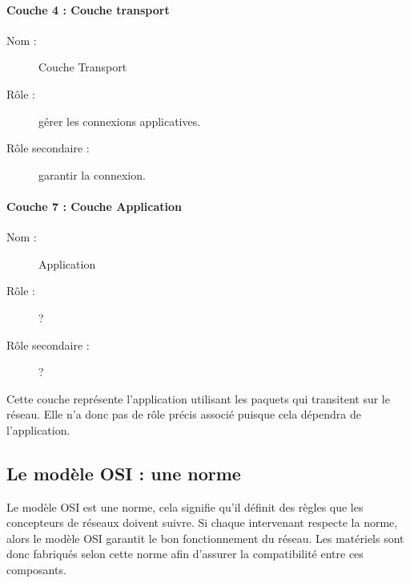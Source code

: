 \paragraph{Couche 4 : Couche transport}
\begin{description}
  \item [Nom : ] Couche Transport
  \item [Rôle : ] gérer les connexions applicatives.
  \item [Rôle secondaire : ] garantir la connexion.
\end{description}


\paragraph{Couche 7 : Couche Application}
\begin{description}
  \item [Nom : ] Application
  \item [Rôle : ] ?
  \item [Rôle secondaire : ] ?
\end{description}
Cette couche représente l'application utilisant les paquets qui transitent sur le réseau. Elle n'a donc pas de rôle précis associé puisque cela dépendra de l'application.

\subsection{Le modèle OSI : une norme}
Le modèle OSI est une  norme, cela signifie qu'il définit des règles que les concepteurs de réseaux doivent suivre. Si chaque intervenant respecte la norme, alors le modèle OSI garantit le bon fonctionnement du réseau. Les matériels sont donc fabriqués selon cette norme afin d'assurer la compatibilité entre ces composants.

